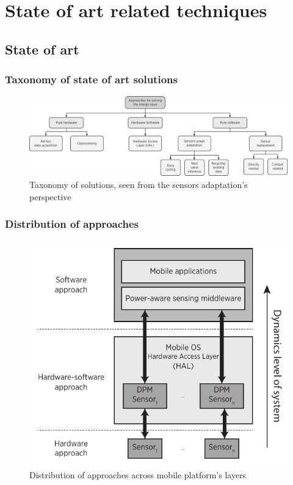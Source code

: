 \documentclass[compress,9pt,xcolor={dvipsnames,table}]{beamer}
\begin{document}
\section[State-of-art]{State of art related techniques}
\subsection{State of art}

\begin{frame}\frametitle{Taxonomy of state of art solutions}

\begin{figure}[tb]
  \centering
  \includegraphics[width=\textwidth]{../../../resources/images/vectors/approaches-taxonomy}
  \caption{Taxonomy of solutions, seen from the sensors adaptation's perspective}
  \label{fig:taxonomy}
\end{figure}
\end{frame}

\begin{frame}\frametitle{Distribution of approaches}
\begin{figure}[tb]
  \centering
  \includegraphics[scale=0.6]{../../../resources/images/vectors/approaches-distribution}
  \caption{Distribution of approaches across mobile platform's layers}
  \label{fig:distribution}
\end{figure}
\end{frame}
\end{document}

